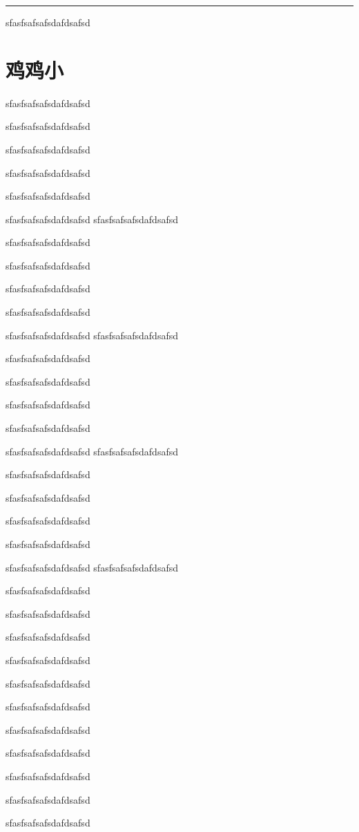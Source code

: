 \documentclass[hyperref,UTF8]{ctexrep}
\newenvironment{thisBody}
	{
		\zihao{3}
	}%
	{
		\clearpage
	}%
\begin{document}



\noindent\rule[0.5ex]{\columnwidth}{0.6pt}

	\begin{thisBody} 
		sfasfsafsafsdafdsafsd
	\end{thisBody}
\section{鸡鸡小}
	\begin{thisBody}
		
		
		
			sfasfsafsafsdafdsafsd
		
		sfasfsafsafsdafdsafsd
		
		sfasfsafsafsdafdsafsd
		
		sfasfsafsafsdafdsafsd
		
		sfasfsafsafsdafdsafsd
		
		
		sfasfsafsafsdafdsafsd
			sfasfsafsafsdafdsafsd
		
		sfasfsafsafsdafdsafsd
		
		sfasfsafsafsdafdsafsd
		
		sfasfsafsafsdafdsafsd
		
		sfasfsafsafsdafdsafsd
		
		
		sfasfsafsafsdafdsafsd
			sfasfsafsafsdafdsafsd
		
		sfasfsafsafsdafdsafsd
		
		sfasfsafsafsdafdsafsd
		
		sfasfsafsafsdafdsafsd
		
		sfasfsafsafsdafdsafsd
		
		
		sfasfsafsafsdafdsafsd
			sfasfsafsafsdafdsafsd
		
		sfasfsafsafsdafdsafsd
		
		sfasfsafsafsdafdsafsd
		
		sfasfsafsafsdafdsafsd
		
		sfasfsafsafsdafdsafsd
		
		
		sfasfsafsafsdafdsafsd
			sfasfsafsafsdafdsafsd
		
		sfasfsafsafsdafdsafsd
		
		sfasfsafsafsdafdsafsd
		
		sfasfsafsafsdafdsafsd
		
		sfasfsafsafsdafdsafsd
		
		
		sfasfsafsafsdafdsafsd
		 
		sfasfsafsafsdafdsafsd
		
			sfasfsafsafsdafdsafsd
			
				sfasfsafsafsdafdsafsd
				
					sfasfsafsafsdafdsafsd
					
						sfasfsafsafsdafdsafsd
						
						
							sfasfsafsafsdafdsafsd
	\end{thisBody}
\end{document}
